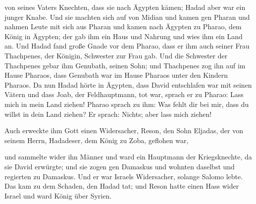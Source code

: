 von seines Vaters Knechten, dass sie nach Ägypten kämen; Hadad aber war
ein junger Knabe.  Und sie machten sich auf von Midian
und kamen gen Pharan und nahmen Leute mit sich aus Pharan und kamen nach
Ägypten zu Pharao, dem König in Ägypten; der gab ihm ein Haus und
Nahrung und wies ihm ein Land an.  Und Hadad fand große
Gnade vor dem Pharao, dass er ihm auch seiner Frau Thachpenes, der
Königin, Schwester zur Frau gab.  Und die Schwester der
Thachpenes gebar ihm Genubath, seinen Sohn; und Thachpenes zog ihn auf
im Hause Pharaos, dass Genubath war im Hause Pharaos unter den Kindern
Pharaos.  Da nun Hadad hörte in Ägypten, dass David
entschlafen war mit seinen Vätern und dass Joab, der Feldhauptmann, tot
war, sprach er zu Pharao: Lass mich in mein Land ziehen! 
Pharao sprach zu ihm: Was fehlt dir bei mir, dass du willst in dein Land
ziehen? Er sprach: Nichts; aber lass mich ziehen!

 Auch erweckte ihm Gott einen Widersacher, Reson, den
Sohn Eljadas, der von seinem Herrn, Hadadeser, dem König zu Zoba,
geflohen war,

 und sammelte wider ihn Männer und ward ein Hauptmann der
Kriegsknechte, da sie David erwürgte; und sie zogen gen Damaskus und
wohnten daselbst und regierten zu Damaskus.  Und er war
Israels Widersacher, solange Salomo lebte. Das kam zu dem Schaden, den
Hadad tat; und Reson hatte einen Hass wider Israel und ward König über
Syrien.

